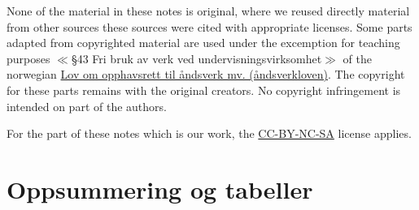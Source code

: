 \documentclass[11pt,parskip=half,x11names, twoside=false, open=any, a4paper]{scrbook}
\begin{document}
None of the material in these notes is original, where we reused directly material from other sources these sources were cited with appropriate licenses. Some parts adapted from copyrighted material are used under the excemption for teaching purposes $\ll$\S 43 Fri bruk av verk ved undervisningsvirksomhet$\gg$ of the norwegian \href{https://lovdata.no/dokument/NL/lov/2018-06-15-40}{Lov om opphavsrett til åndsverk mv. (åndsverkloven)}. The copyright for these parts remains with the original creators. No copyright infringement is intended on part of the authors.

For the part of these notes which is our work, the \href{https://creativecommons.org/licenses/by-nc-sa/4.0/}{CC-BY-NC-SA} license applies.
\pagestyle{empty}
\newpage
\tableofcontents

\pagestyle{headings}

\setcounter{page}{1}







\appendix
\chapter{Oppsummering og tabeller}




\end{document}
